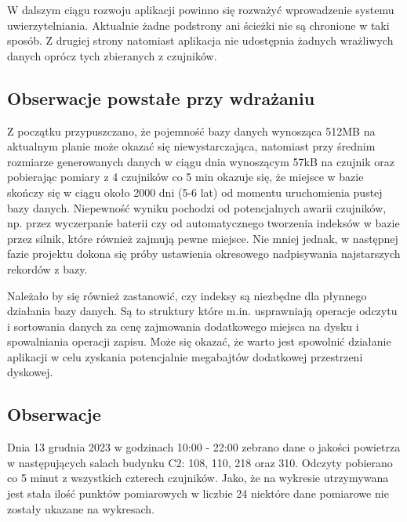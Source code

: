 W dalszym ciągu rozwoju aplikacji powinno się rozważyć wprowadzenie systemu uwierzytelniania. Aktualnie żadne podstrony ani ścieżki nie są chronione w taki sposób.
Z drugiej strony natomiast aplikacja nie udostępnia żadnych wrażliwych danych oprócz tych zbieranych z czujników.

\subsection{Obserwacje powstałe przy wdrażaniu}

Z początku przypuszczano, że pojemność bazy danych wynosząca 512MB na aktualnym planie może okazać się niewystarczająca, natomiast przy średnim rozmiarze 
generowanych danych w ciągu dnia wynoszącym 57kB na czujnik oraz pobierając pomiary z 4 czujników co 5 min okazuje się, że miejsce w bazie skończy się w ciągu około 2000 dni
(5-6 lat) od momentu uruchomienia pustej bazy danych. Niepewność wyniku pochodzi od potencjalnych awarii czujników, np. przez wyczerpanie baterii czy od 
automatycznego tworzenia indeksów w bazie przez silnik, które również zajmują pewne miejsce. Nie mniej jednak, w następnej fazie 
projektu dokona się próby ustawienia okresowego nadpisywania najstarszych rekordów z bazy.

Należało by się również zastanowić, czy indeksy są niezbędne dla płynnego działania bazy danych. Są to struktury które m.in. usprawniają operacje odczytu i sortowania danych
za cenę zajmowania dodatkowego miejsca na dysku i spowalniania operacji zapisu. Może się okazać, że warto jest spowolnić działanie aplikacji w celu zyskania potencjalnie 
megabajtów dodatkowej przestrzeni dyskowej.

\subsection{Obserwacje}

Dnia 13 grudnia 2023 w godzinach 10:00 - 22:00 zebrano dane o jakości powietrza w następujących salach budynku C2: 108, 110, 218 oraz 310. Odczyty pobierano
co 5 minut z wszystkich czterech czujników. Jako, że na wykresie utrzymywana jest stała ilość punktów pomiarowych w liczbie 24 niektóre dane pomiarowe 
nie zostały ukazane na wykresach.

